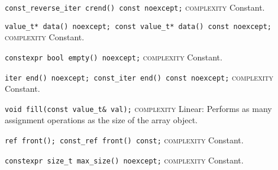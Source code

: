 \noindent{}\hspace*{0.25em}\lstinline[basicstyle=\ttfamily\color{cgreen}]{const_reverse_iter crend() const noexcept;} \textsc{complexity} Constant.\\\vspace{-0.6em}

\noindent{}\hspace*{0.25em}\lstinline[basicstyle=\ttfamily\color{cgreen}]{value_t* data() noexcept; const value_t* data() const noexcept;} \textsc{complexity} Constant.\\\vspace{-0.6em}

\noindent{}\hspace*{0.25em}\lstinline[basicstyle=\ttfamily\color{cgreen}]{constexpr bool empty() noexcept;} \textsc{complexity} Constant.\\\vspace{-0.6em}

\noindent{}\hspace*{0.25em}\lstinline[basicstyle=\ttfamily\color{cgreen}]{iter end() noexcept; const_iter end() const noexcept;} \textsc{complexity} Constant.\\\vspace{-0.6em}

\noindent{}\hspace*{0.25em}\lstinline[basicstyle=\ttfamily\color{corange}]{void fill(const value_t& val);} \textsc{complexity} Linear: Performs as many assignment operations as the size of the array object.\\\vspace{-0.6em}

\noindent{}\hspace*{0.25em}\lstinline[basicstyle=\ttfamily\color{cgreen}]{ref front(); const_ref front() const;} \textsc{complexity} Constant.\\\vspace{-0.6em}

\noindent{}\hspace*{0.25em}\lstinline[basicstyle=\ttfamily\color{cgreen}]{constexpr size_t max_size() noexcept;} \textsc{complexity} Constant.\\\vspace{-0.6em}

